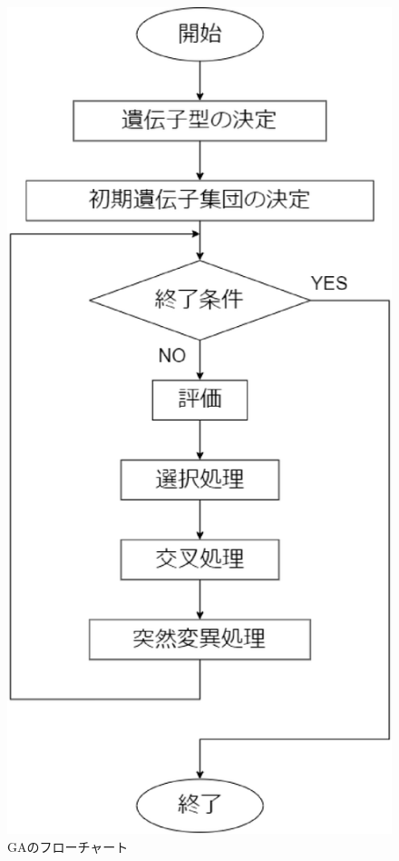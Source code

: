 \begin{figure}[p]
\begin{center}

\vspace{1.5cm}
\includegraphics[scale=0.6]{figure/chapter2/GAflow.eps}
\caption{GAのフローチャート}
\label{遺伝的アルゴリズムのフローチャート}

\end{center}
\end{figure}

